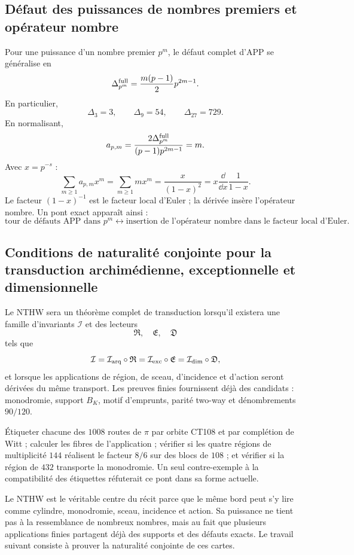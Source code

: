 \subsection{Défaut des puissances de nombres premiers et opérateur nombre}

Pour une puissance d'un nombre premier \(p^m\), le défaut complet d'APP se généralise en
\[
\Delta_{p^m}^{\rm full}
=\frac{m(p-1)}2p^{2m-1}.
\]
En particulier,
\[
\Delta_3=3,
\qquad
\Delta_9=54,
\qquad
\Delta_{27}=729.
\]
En normalisant,
\[
a_{p,m}
=\frac{2\Delta_{p^m}^{\rm full}}{(p-1)p^{2m-1}}
=m.
\]
Avec \(x=p^{-s}\) :
\[
\sum_{m\ge1}a_{p,m}x^m
=\sum_{m\ge1}mx^m
=\frac{x}{(1-x)^2}
=x\frac{\dd}{\dd x}\frac1{1-x}.
\]
Le facteur \((1-x)^{-1}\) est le facteur local d'Euler ; la dérivée insère
l'opérateur nombre. Un pont exact apparaît ainsi :
\[
\boxed{
\text{tour de défauts APP dans }p^m
\longleftrightarrow
\text{insertion de l'opérateur nombre dans le facteur local d'Euler}.}
\]

\subsection{Conditions de naturalité conjointe pour la transduction archimédienne, exceptionnelle et dimensionnelle}

Le NTHW sera un théorème complet de transduction lorsqu'il existera une famille
d'invariants \(\mathcal I\) et des lecteurs
\[
\mathfrak R,\quad\mathfrak E,\quad\mathfrak D
\]
tels que
\[
\mathcal I
=\mathcal I_{\rm arq}\circ\mathfrak R
=\mathcal I_{\rm exc}\circ\mathfrak E
=\mathcal I_{\rm dim}\circ\mathfrak D,
\]
et lorsque les applications de région, de sceau, d'incidence et d'action seront dérivées du même
transport. Les preuves finies fournissent déjà des candidats : monodromie,
support \(B_K\), motif d'emprunts, parité two-way et dénombrements \(90/120\).

\begin{programbox}[title={Preuve exécutable 108--144--90--120}]
Étiqueter chacune des \(1008\) routes de \(\pi\) par orbite CT108 et par
complétion de Witt ; calculer les fibres de l'application ; vérifier si les quatre
régions de multiplicité \(144\) réalisent le facteur \(8/6\) sur des blocs
de \(108\) ; et vérifier si la région de \(432\) transporte la monodromie. Un
seul contre-exemple à la compatibilité des étiquettes réfuterait ce pont dans
sa forme actuelle.
\end{programbox}

\begin{takeawaybox}
Le NTHW est le véritable centre du récit parce que le même bord peut s'y lire
comme cylindre, monodromie, sceau, incidence et action. Sa puissance ne tient pas
à la ressemblance de nombreux nombres, mais au fait que plusieurs applications finies
partagent déjà des supports et des défauts exacts. Le travail suivant consiste à prouver la
naturalité conjointe de ces cartes.
\end{takeawaybox}


